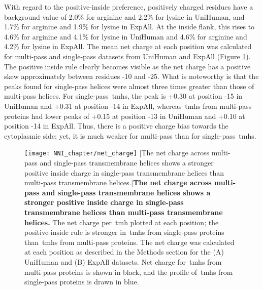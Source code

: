 With regard to the positive-inside preference, positively charged residues have a background value of 2.0\% for arginine and 2.2\% for lysine in UniHuman, and 1.7\% for arginine and 1.9\% for lysine in ExpAll.
At the inside flank, this rises to 4.6\% for arginine and 4.1\% for lysine in UniHuman and 4.6\% for arginine and 4.2\% for lysine in ExpAll.
The mean net charge at each position was calculated for multi-pass and single-pass datasets from UniHuman and ExpAll (Figure \ref{fig:net_charge}).
The positive inside rule clearly becomes visible as the net charge has a positive skew approximately between residues -10 and -25.
What is noteworthy is that the peaks found for single-pass helices were almost three times greater than those of multi-pass helices.
For single-pass~\gls{tmh}s, the peak is +0.30 at position -15 in UniHuman and +0.31 at position -14 in ExpAll, whereas~\gls{tmh}s from multi-pass proteins had lower peaks of +0.15 at position -13 in UniHuman and +0.10 at position -14 in ExpAll.
Thus, there is a positive charge bias towards the cytoplasmic side; yet, it is much weaker for multi-pass than for single-pass~\gls{tmh}s.

\begin{figure}[!ht]
\centering
\texttt{[image: NNI\_chapter/net\_charge]}
[The net charge across multi-pass and single-pass transmembrane helices shows a stronger positive inside charge in single-pass transmembrane helices than multi-pass transmembrane helices.]{\textbf{The net charge across multi-pass and single-pass transmembrane helices shows a stronger positive inside charge in single-pass transmembrane helices than multi-pass transmembrane helices.}
The net charge per~\gls{tmh} plotted at each position; the positive-inside rule is stronger in~\gls{tmh}s from single-pass proteins than~\gls{tmh}s from multi-pass proteins.
The net charge was calculated at each position as described in the Methods section for the (A) UniHuman and (B) ExpAll datasets.
Net charge for~\gls{tmh}s from multi-pass proteins is shown in black, and the profile of~\gls{tmh}s from single-pass proteins is drawn in blue.}

\label{fig:net_charge}
\end{figure}

